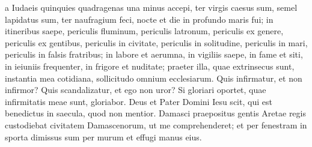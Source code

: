 \begin{biblechapter}
\verse a Iudaeis quinquies quadragenas una minus accepi, 
\verse ter virgis caesus sum, semel lapidatus sum, ter naufragium feci, nocte et die in profundo maris fui; 
\verse in itineribus saepe, periculis fluminum, periculis latronum, periculis ex genere, periculis ex gentibus, periculis in civitate, periculis in solitudine, periculis in mari, periculis in falsis fratribus; 
\verse in labore et aerumna, in vigiliis saepe, in fame et siti, in ieiuniis frequenter, in frigore et nuditate; 
\verse praeter illa, quae extrinsecus sunt, instantia mea cotidiana, sollicitudo omnium ecclesiarum.  
\verse Quis infirmatur, et non infirmor? Quis scandalizatur, et ego non uror? 
\verse Si gloriari oportet, quae infirmitatis meae sunt, gloriabor. 
\verse Deus et Pater Domini Iesu scit, qui est benedictus in saecula, quod non mentior. 
\verse Damasci praepositus gentis Aretae regis custodiebat civitatem Damascenorum, ut me comprehenderet; 
\verse et per fenestram in sporta dimissus sum per murum et effugi manus eius. 
\end{biblechapter}

